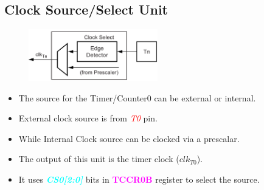 \documentclass{article}
\newcommand{\bitFormat}[1]{\emph{\textbf{\textcolor{cyan}{#1}}}}
\newcommand{\regFormat}[1]{\textbf{\textcolor{magenta}{#1}}}
\newcommand{\pinFormat}[1]{\emph{\textcolor{red}{#1}}}
\begin{document}
\subsection{Clock Source/Select Unit}
\begin{figure}[H]
    \begin{center}
        \includegraphics[width=0.5\textwidth]{Timer0ClockSelector.png}
    \end{center}
\end{figure}
\begin{itemize}
    \item The source for the Timer/Counter0 can be external or internal.
    \item External clock source is from \pinFormat{T0} pin.
    \item While Internal Clock source can be clocked via a prescalar.
    \item The output of this unit is the timer clock ($clk_{T0}$).
    \item It uses \bitFormat{CS0[2:0]} bits in \regFormat{TCCR0B} register to select the source.
\end{itemize}
\end{document}
